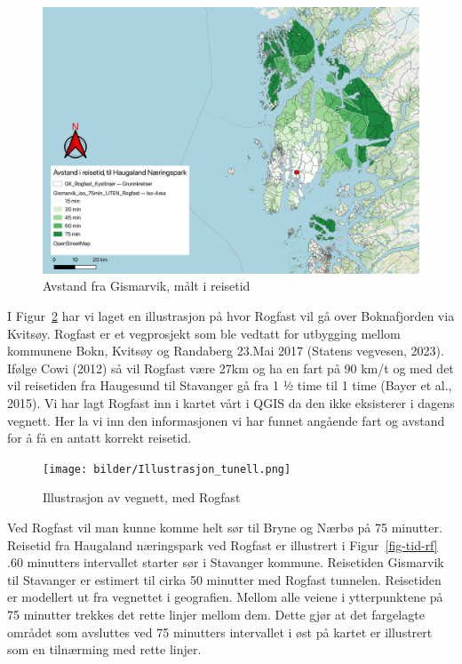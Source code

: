 \documentclass[
]{article}
\begin{document}
\begin{figure}[H]

{\centering \includegraphics{bilder/reisetid_ferje.png}

}

\caption{\label{fig-rtid}Avstand fra Gismarvik, målt i reisetid}

\end{figure}

I Figur~\ref{fig-prosj-rog} har vi laget en illustrasjon på hvor Rogfast
vil gå over Boknafjorden via Kvitsøy. Rogfast er et vegprosjekt som ble
vedtatt for utbygging mellom kommunene Bokn, Kvitsøy og Randaberg 23.Mai
2017 (Statens vegvesen, 2023). Ifølge Cowi (2012) så vil Rogfast være
27km og ha en fart på 90 km/t og med det vil reisetiden fra Haugesund
til Stavanger gå fra 1 ½ time til 1 time (Bayer et al., 2015). Vi har
lagt Rogfast inn i kartet vårt i QGIS da den ikke eksisterer i dagens
vegnett. Her la vi inn den informasjonen vi har funnet angående fart og
avstand for å få en antatt korrekt reisetid.

\begin{figure}[H]

{\centering \texttt{[image: bilder/Illustrasjon\_tunell.png]}

}

\caption{\label{fig-prosj-rog}Illustrasjon av vegnett, med Rogfast}

\end{figure}

Ved Rogfast vil man kunne komme helt sør til Bryne og Nærbø på 75
minutter. Reisetid fra Haugaland næringspark ved Rogfast er illustrert i
Figur~\ref{fig-tid-rf} .60 minutters intervallet starter sør i Stavanger
kommune. Reisetiden Gismarvik til Stavanger er estimert til cirka 50
minutter med Rogfast tunnelen. Reisetiden er modellert ut fra vegnettet
i geografien. Mellom alle veiene i ytterpunktene på 75 minutter trekkes
det rette linjer mellom dem. Dette gjør at det fargelagte området som
avsluttes ved 75 minutters intervallet i øst på kartet er illustrert som
en tilnærming med rette linjer.
\end{document}

